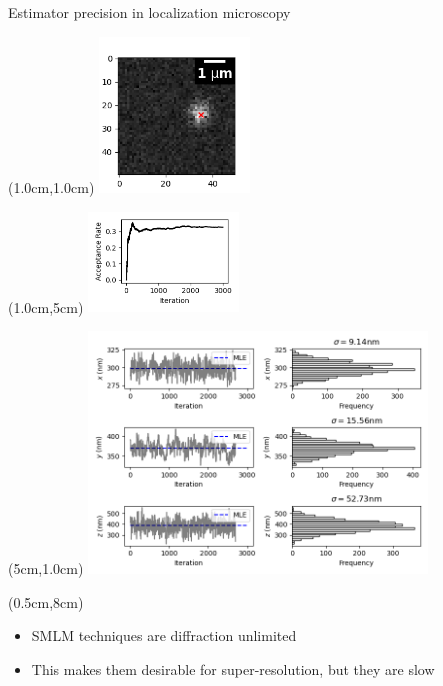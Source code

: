 \documentclass{beamer}					%
\begin{document}
\begin{frame}{Estimator precision in localization microscopy}
\begin{textblock*}{4cm}(1.0cm,1.0cm)
\includegraphics[width=4cm]{MCMC/Figure_1.png}
\end{textblock*}
\begin{textblock*}{4cm}(1.0cm,5cm)
\includegraphics[width=4cm]{MCMC/Figure_2.png}
\end{textblock*}
\begin{textblock*}{9cm}(5cm,1.0cm)
\includegraphics[width=9cm]{MCMC/Figure_3.png}
\end{textblock*}
\begin{textblock*}{13cm}(0.5cm,8cm)
\begin{itemize}
\item SMLM techniques are diffraction unlimited
\item This makes them desirable for super-resolution, but they are slow
\end{itemize}
\end{textblock*}
\end{frame}
\end{document}
